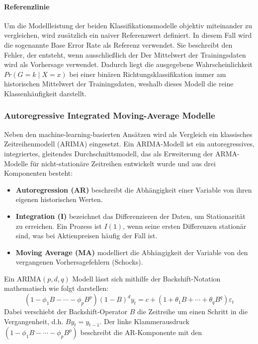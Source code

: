\paragraph{Referenzlinie}
Um die Modellleistung der beiden Klassifikationsmodelle objektiv miteinander zu vergleichen, wird zusätzlich ein naiver Referenzwert definiert. In diesem Fall wird die sogenannte Base Error Rate als Referenz verwendet. Sie beschreibt den Fehler, der entsteht, wenn ausschließlich der 
Der Mittelwert der Trainingsdaten wird als Vorhersage verwendet. Dadurch liegt die ausgegebene Wahrscheinlichkeit $Pr(G = k \mid X = x)$ bei einer binären Richtungsklassifikation immer am historischen Mittelwert der Trainingsdaten, weshalb dieses Modell die reine Klassenhäufigkeit darstellt. \cite[S.~51]{tesl}

\subsubsection{Autoregressive Integrated Moving-Average Modelle}
\label{arima}
Neben den machine-learning-basierten Ansätzen wird als Vergleich ein klassisches Zeitreihenmodell (ARIMA) eingesetzt. Ein ARIMA-Modell ist ein autoregressives, integriertes, gleitendes Durchschnittsmodell, das als Erweiterung der ARMA-Modelle für nicht-stationäre Zeitreihen entwickelt wurde \cite[S.~67f.]{tsay_analysis_2005} und aus drei Komponenten besteht:
\begin{itemize}
    \item \textbf{Autoregression (AR)} beschreibt die Abhängigkeit einer Variable von ihren eigenen historischen Werten.
    \item \textbf{Integration (I)} bezeichnet das Differenzieren der Daten, um Stationarität zu erreichen. Ein Prozess ist $I(1)$, wenn seine ersten Differenzen stationär sind, was bei Aktienpreisen häufig der Fall ist.
    \item \textbf{Moving Average (MA)} modelliert die Abhängigkeit der Variable von den vergangenen Vorhersagefehlern (Schocks).
\end{itemize}
Ein $\mathrm{ARIMA}(p,d,q)$ Modell lässt sich mithilfe der Backshift-Notation 
mathematisch wie folgt darstellen: \cite[Formel 9.2]{fpp}
\begin{equation}
    (1 - \phi_1 B - \cdots - \phi_p B^p)(1-B)^d y_t = c + (1 + \theta_1 B + \cdots + \theta_q B^q)\varepsilon_t
\end{equation}
Dabei verschiebt der Backshift-Operator $B$ die Zeitreihe um einen Schritt in die Vergangenheit, d.h. $B y_t = y_{t-1}$. Der linke Klammerausdruck $(1 - \phi_1 B - \cdots - \phi_p B^p)$ beschreibt die AR-Komponente mit den 
